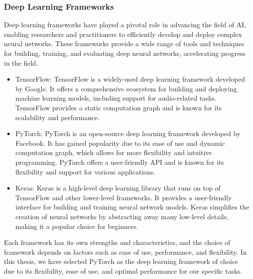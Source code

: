 \begin{frame}
    \frametitle{Deep Learning Frameworks}

    Deep learning frameworks have played a pivotal role in advancing the field of AI, enabling researchers and practitioners to efficiently develop and deploy complex neural networks. These frameworks provide a wide range of tools and techniques for building, training, and evaluating deep neural networks, accelerating progress in the field.

    \begin{itemize}
        \item TensorFlow: TensorFlow is a widely-used deep learning framework developed by Google. It offers a comprehensive ecosystem for building and deploying machine learning models, including support for audio-related tasks. TensorFlow provides a static computation graph and is known for its scalability and performance.

        \item PyTorch: PyTorch is an open-source deep learning framework developed by Facebook. It has gained popularity due to its ease of use and dynamic computation graph, which allows for more flexibility and intuitive programming. PyTorch offers a user-friendly API and is known for its flexibility and support for various applications.

        \item Keras: Keras is a high-level deep learning library that runs on top of TensorFlow and other lower-level frameworks. It provides a user-friendly interface for building and training neural network models. Keras simplifies the creation of neural networks by abstracting away many low-level details, making it a popular choice for beginners.

    \end{itemize}

    Each framework has its own strengths and characteristics, and the choice of framework depends on factors such as ease of use, performance, and flexibility. In this thesis, we have selected PyTorch as the deep learning framework of choice due to its flexibility, ease of use, and optimal performance for our specific tasks.

\end{frame}


